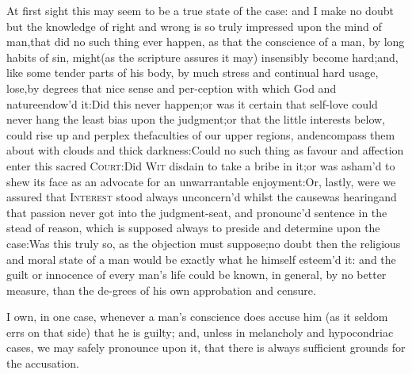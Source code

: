 \documentclass{article}
\begin{document}
\begin{story}{At first sight this may seem to be a}
    true state of the case: and I make no doubt but the
    knowledge of right and wrong is so truly impressed
    upon the mind of man,\tsk that did no such thing
    ever happen, as that the conscience of a man, by
    long habits of sin, might\break (as the scripture
    assures it may) insensibly become hard;\tsk and,
    like some tender parts of his body, by much stress
    and continual hard usage, lose,\break by degrees
    that nice sense and per-\break ception with which
    God and nature\break endow’d it:\tsk Did this never
    happen;\break \tsk or was it certain that self-love
    could never hang the least bias upon the\break
    judgment;\tsk or that the little interests\break
    below, could rise up and perplex the\break faculties
    of our upper regions, and\pb encompass them about
    with clouds and thick darkness:\tsh Could no
    such\break
    thing as favour and affection enter this sacred
    \textsc{Court}:\tsh  Did \textsc{Wit} disdain to
    take a bribe in it;\tsk or was asham’d to shew its
    face as an advocate for an unwarrantable
    enjoyment:\tsk Or, lastly, were we assured that
    \textsc{Interest} stood always unconcern’d whilst
    the cause\break was hearing\tsk and that passion never got
    into the judgment-seat, and pronounc’d sentence in
    the stead of reason, which is supposed always to
    preside and determine upon the case:\tsk Was this
    truly so, as the objection must suppose;\tsk no
    doubt then the religious and moral state of a man
    would be exactly what he himself esteem’d
    it:\tsk\break 
    and the guilt or innocence of every\break
    man’s life could be known, in general,\break
    by no better measure, than the de-\pb grees of his own
    approbation and censure.
\end{story}
\vspace\parskip

\begin{story}{I own, in one case, whenever a man’s}
conscience does accuse him (as it seldom errs on that side) that he
is guilty; and, unless in melancholy and hypocondriac cases,
we may safely pronounce upon it, that there is always sufficient
grounds for the accusation.
\end{story}
\vspace\parskip
\end{document}
